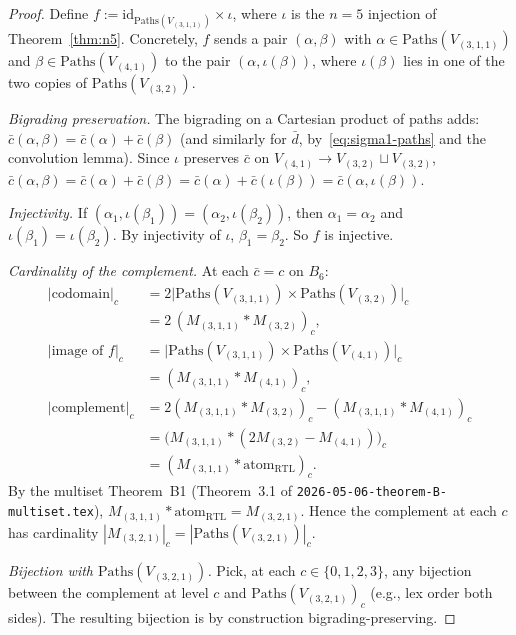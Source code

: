 \documentclass[11pt]{article}
\theoremstyle{definition}
\begin{document}
\begin{proof}
Define $f := \mathrm{id}_{\mathrm{Paths}(V_{(3,1,1)})} \times \iota$, where $\iota$ is the $n=5$ injection of Theorem~\ref{thm:n5}. Concretely, $f$ sends a pair $(\alpha, \beta)$ with $\alpha \in \mathrm{Paths}(V_{(3,1,1)})$ and $\beta \in \mathrm{Paths}(V_{(4,1)})$ to the pair $(\alpha, \iota(\beta))$, where $\iota(\beta)$ lies in one of the two copies of $\mathrm{Paths}(V_{(3,2)})$.

\emph{Bigrading preservation.} The bigrading on a Cartesian product of paths adds: $\bar c(\alpha, \beta) = \bar c(\alpha) + \bar c(\beta)$ (and similarly for $\bar d$, by~\eqref{eq:sigma1-paths} and the convolution lemma). Since $\iota$ preserves $\bar c$ on $V_{(4,1)} \to V_{(3,2)} \sqcup V_{(3,2)}$, $\bar c(\alpha, \beta) = \bar c(\alpha) + \bar c(\beta) = \bar c(\alpha) + \bar c(\iota(\beta)) = \bar c(\alpha, \iota(\beta))$.

\emph{Injectivity.} If $(\alpha_1, \iota(\beta_1)) = (\alpha_2, \iota(\beta_2))$, then $\alpha_1 = \alpha_2$ and $\iota(\beta_1) = \iota(\beta_2)$. By injectivity of $\iota$, $\beta_1 = \beta_2$. So $f$ is injective.

\emph{Cardinality of the complement.} At each $\bar c = c$ on $B_6$:
\begin{align*}
\bigl|\text{codomain}\bigr|_c &= 2 \bigl|\mathrm{Paths}(V_{(3,1,1)}) \times \mathrm{Paths}(V_{(3,2)})\bigr|_c \\
&= 2 \,(M_{(3,1,1)} \ast M_{(3,2)})_c, \\
\bigl|\text{image of } f\bigr|_c &= \bigl|\mathrm{Paths}(V_{(3,1,1)}) \times \mathrm{Paths}(V_{(4,1)})\bigr|_c \\
&= (M_{(3,1,1)} \ast M_{(4,1)})_c, \\
\bigl|\text{complement}\bigr|_c &= 2 (M_{(3,1,1)} \ast M_{(3,2)})_c - (M_{(3,1,1)} \ast M_{(4,1)})_c \\
&= \bigl(M_{(3,1,1)} \ast (2 M_{(3,2)} - M_{(4,1)})\bigr)_c \\
&= (M_{(3,1,1)} \ast \mathrm{atom}_{\mathrm{RTL}})_c.
\end{align*}
By the multiset Theorem~B1 (Theorem~3.1 of \texttt{2026-05-06-theorem-B-multiset.tex}), $M_{(3,1,1)} \ast \mathrm{atom}_{\mathrm{RTL}} = M_{(3,2,1)}$. Hence the complement at each $c$ has cardinality $|M_{(3,2,1)}|_c = |\mathrm{Paths}(V_{(3,2,1)})|_c$.

\emph{Bijection with $\mathrm{Paths}(V_{(3,2,1)})$.} Pick, at each $c \in \{0,1,2,3\}$, any bijection between the complement at level $c$ and $\mathrm{Paths}(V_{(3,2,1)})_c$ (e.g., lex order both sides). The resulting bijection is by construction bigrading-preserving. \qedhere
\end{proof}
\end{document}
